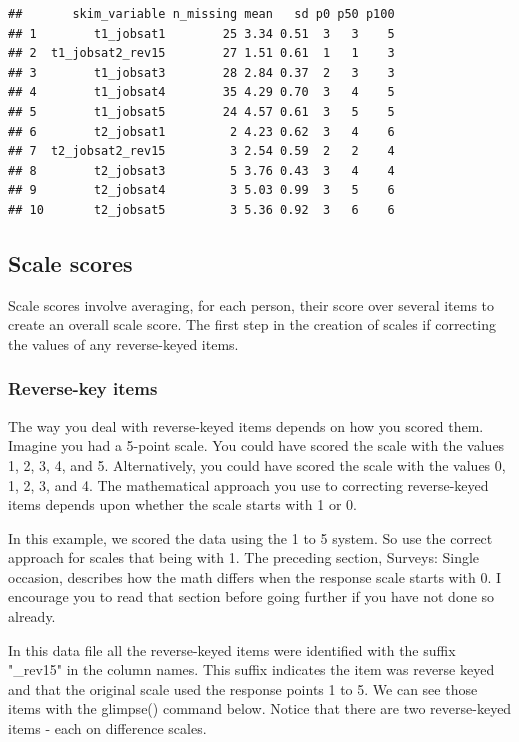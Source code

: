 \documentclass[
]{krantz}
\begin{document}
\begin{verbatim}
##       skim_variable n_missing mean   sd p0 p50 p100
## 1        t1_jobsat1        25 3.34 0.51  3   3    5
## 2  t1_jobsat2_rev15        27 1.51 0.61  1   1    3
## 3        t1_jobsat3        28 2.84 0.37  2   3    3
## 4        t1_jobsat4        35 4.29 0.70  3   4    5
## 5        t1_jobsat5        24 4.57 0.61  3   5    5
## 6        t2_jobsat1         2 4.23 0.62  3   4    6
## 7  t2_jobsat2_rev15         3 2.54 0.59  2   2    4
## 8        t2_jobsat3         5 3.76 0.43  3   4    4
## 9        t2_jobsat4         3 5.03 0.99  3   5    6
## 10       t2_jobsat5         3 5.36 0.92  3   6    6
\end{verbatim}

\hypertarget{scale-scores-1}{%
\subsection{Scale scores}\label{scale-scores-1}}

Scale scores involve averaging, for each person, their score over several items to create an overall scale score. The first step in the creation of scales if correcting the values of any reverse-keyed items.

\hypertarget{reverse-key-items-1}{%
\subsubsection{Reverse-key items}\label{reverse-key-items-1}}

The way you deal with reverse-keyed items depends on how you scored them. Imagine you had a 5-point scale. You could have scored the scale with the values 1, 2, 3, 4, and 5. Alternatively, you could have scored the scale with the values 0, 1, 2, 3, and 4. The mathematical approach you use to correcting reverse-keyed items depends upon whether the scale starts with 1 or 0.

In this example, we scored the data using the 1 to 5 system. So use the correct approach for scales that being with 1. The preceding section, Surveys: Single occasion, describes how the math differs when the response scale starts with 0. I encourage you to read that section before going further if you have not done so already.

In this data file all the reverse-keyed items were identified with the suffix "\_rev15" in the column names. This suffix indicates the item was reverse keyed and that the original scale used the response points 1 to 5. We can see those items with the glimpse() command below. Notice that there are two reverse-keyed items - each on difference scales.
\end{document}
